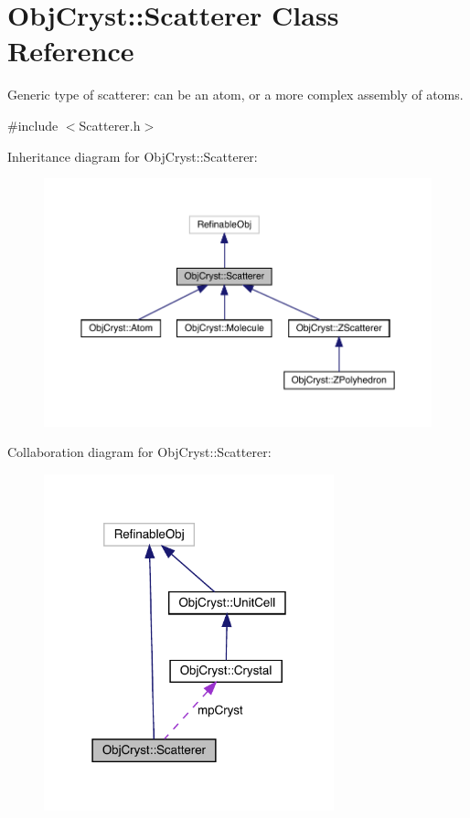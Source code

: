 \hypertarget{class_obj_cryst_1_1_scatterer}{}\section{Obj\+Cryst\+::Scatterer Class Reference}
\label{class_obj_cryst_1_1_scatterer}


Generic type of scatterer\+: can be an atom, or a more complex assembly of atoms.  




{\ttfamily \#include $<$Scatterer.\+h$>$}



Inheritance diagram for Obj\+Cryst\+::Scatterer\+:
\nopagebreak
\begin{figure}[H]
\begin{center}
\leavevmode
\includegraphics[width=350pt]{class_obj_cryst_1_1_scatterer__inherit__graph}
\end{center}
\end{figure}


Collaboration diagram for Obj\+Cryst\+::Scatterer\+:
\nopagebreak
\begin{figure}[H]
\begin{center}
\leavevmode
\includegraphics[width=238pt]{class_obj_cryst_1_1_scatterer__coll__graph}
\end{center}
\end{figure}
